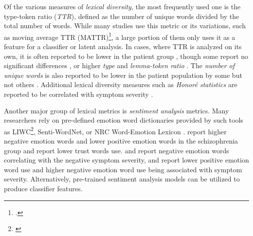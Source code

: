 Of the various measures of \textit{lexical diversity}, the most frequently used one is the type-token ratio (\textit{TTR}), defined as the number of unique words divided by the total number of words. While many studies use this metric or its variations, such as moving average TTR (MATTR)\footnote{\cite{rosenstein2015language, willits2018evidence, kramov2020evaluating, hitczenko2021understanding, liang2022widespread, aich2022towards, ziv2022morphological, jeong2023exploring, minor2023automated, schneider2023syntactic, tang2023latent}.}, a large portion of them only uses it as a feature for a classifier or latent analysis. In cases, where TTR is analyzed on its own, it is often reported to be lower in the patient group \citep{willits2018evidence, aich2022towards, minor2023automated}, though some report no significant differences \citep{hitczenko2021understanding, jeong2023exploring, schneider2023syntactic}, or higher \textit{type} and \textit{lemma-token ratio} \citep{ziv2022morphological}. The \textit{number of unique words} is also reported to be lower in the patient population by some \citep{willits2018evidence} but not others \citep{schneider2023syntactic}. Additional lexical diversity measures such as \textit{Honoré statistics} are reported to be correlated with symptom severity \citep{jeong2023exploring}. 

Another major group of lexical metrics is \textit{sentiment analysis} metrics. Many researchers rely on pre-defined emotion word dictionaries provided by such tools as LIWC\footnote{\cite{mitchell2015quantifying, vail2018toward, girard2022computational, mota2022happy, minor2023automated}}, Senti-WordNet, or NRC Word-Emotion Lexicon \citep{aich2022towards}. \citet{mitchell2015quantifying} report higher negative emotion words and lower positive emotion words in the schizophrenia group and \citet{aich2022towards} report lower trust words use. \citet{vail2018toward} and \citet{girard2022computational} report negative emotion words correlating with the negative symptom severity, and \citet{minor2023automated} report lower positive emotion word use and higher negative emotion word use being associated with symptom severity. Alternatively, pre-trained sentiment analysis models can be utilized \citep{tang2022clinical, tang2023latent} to produce classifier features.


